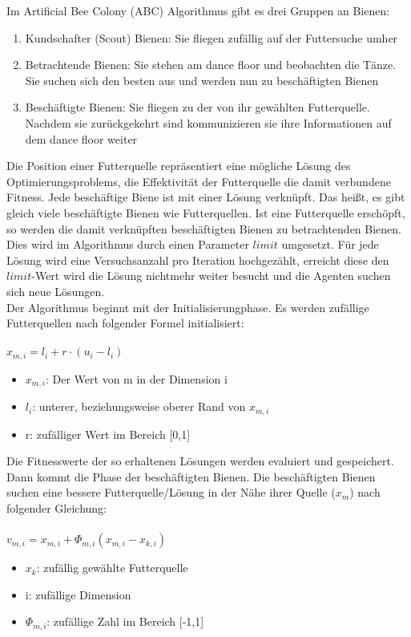 Im Artificial Bee Colony (ABC) Algorithmus gibt es drei Gruppen an Bienen:
\begin{enumerate}
  \item Kundschafter (Scout) Bienen: Sie fliegen zufällig auf der Futtersuche umher
  \item Betrachtende Bienen: Sie stehen am dance floor und beobachten die Tänze. Sie suchen sich den besten aus und werden nun zu beschäftigten Bienen
  \item Beschäftigte Bienen: Sie fliegen zu der von ihr gewählten Futterquelle. Nachdem sie zurückgekehrt sind kommunizieren sie ihre Informationen auf dem dance floor weiter
\end{enumerate} 
Die Position einer Futterquelle repräsentiert eine mögliche Lösung des Optimierungsproblems, die Effektivität der Futterquelle die damit verbundene Fitness.
Jede beschäftige Biene ist mit einer Lösung verknüpft. Das heißt, es gibt gleich viele beschäftigte Bienen wie Futterquellen.\cite{ pham2005bees} Ist eine Futterquelle erschöpft, so werden die damit verknüpften beschäftigten Bienen zu betrachtenden Bienen. Dies wird im Algorithmus durch einen Parameter $limit$ umgesetzt. Für jede Lösung wird eine Versuchsanzahl pro Iteration hochgezählt, erreicht diese den $limit$-Wert wird die Lösung nichtmehr weiter besucht und die Agenten suchen sich neue Lösungen.
\\
Der Algorithmus beginnt mit der Initialisierungphase. Es werden zufällige Futterquellen nach folgender Formel initialisiert: \\\\\large
$x_{m,i}=l_i+r \cdot (u_i-l_i)$
\normalsize
\begin{itemize}
  \item $x_{m,i}$: Der Wert von m in der Dimension i
  \item $l_i$: unterer, beziehungsweise oberer Rand von $x_{m,i}$
  \item r: zufälliger Wert im Bereich [0,1]
\end{itemize}

Die Fitnesswerte der so erhaltenen Lösungen werden evaluiert und gespeichert.\\
Dann kommt die Phase der beschäftigten Bienen.
Die beschäftigten Bienen suchen eine bessere Futterquelle/Lösung in der Nähe ihrer Quelle ($x_m$) nach folgender Gleichung: \\\\\large
$v_{m,i}= x_{m,i}+\Phi _{m,i}( x_{m,i}- x_{k,i})$
\normalsize
\begin{itemize}
  \item $x_k$: zufällig gewählte Futterquelle
  \item i: zufällige Dimension
  \item $\Phi _{m,i}$: zufällige Zahl im Bereich [-1,1]
\end{itemize}

